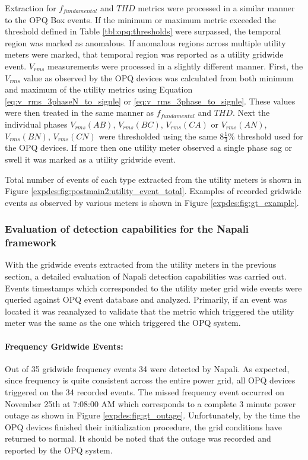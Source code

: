 Extraction for $f_{fundamental}$ and $THD$ metrics were processed in a similar manner to the OPQ Box events.
If the minimum or maximum metric exceeded the threshold defined in Table \ref{tbl:opq:thresholds} were surpassed, the temporal region was marked as anomalous.
If anomalous regions across multiple utility meters were marked, that temporal region was reported as a utility gridwide event.
$V_{rms}$ measurements were processed in a slightly different manner.
First, the $V_{rms}$ value as observed by the OPQ devices was calculated from both minimum and maximum of the utility metrics using Equation \ref{eq:v_rms_3phaseN_to_signle} or \ref{eq:v_rms_3phase_to_signle}.
These values were then treated in the same manner as $f_{fundamental}$ and $THD$.
Next the individual phases $V_{rms}(AB)$, $V_{rms}(BC)$, $V_{rms}(CA)$ or $V_{rms}(AN)$, $V_{rms}(BN)$, $V_{rms}(CN)$ were thresholded using the same $8\frac{1}{3}\%$ threshold used for the OPQ devices.
If more then one utility meter observed a single phase sag or swell it was marked as a utility gridwide event.

Total number of events of each type extracted from the utility meters is shown in Figure \ref{expdes:fig:postmain2:utility_event_total}.
Examples of recorded gridwide events as observed by various meters is shown in Figure \ref{expdes:fig:gt_example}.

\subsubsection{Evaluation of detection capabilities for the Napali framework}

With the gridwide events extracted from the utility meters in the previous section, a detailed evaluation of Napali detection capabilities was carried out.
Events timestamps which corresponded to the utility meter grid wide events were queried against OPQ event database and analyzed.
Primarily, if an event was located it was reanalyzed to validate that the metric which triggered the utility meter was the same as the one which triggered the OPQ system.

\paragraph{Frequency Gridwide Events:} Out of 35 gridwide frequency events 34 were detected by Napali.
As expected, since frequency is quite consistent across the entire power grid, all OPQ devices triggered on the 34 recorded events.
The missed frequency event occurred on November 25th at 7:08:00 AM which corresponds to a complete 3 minute power outage as shown in Figure \ref{expdes:fig:gt_outage}.
Unfortunately, by the time the OPQ devices finished their initialization procedure, the grid conditions have returned to normal.
It should be noted that the outage was recorded and reported by the OPQ system.

